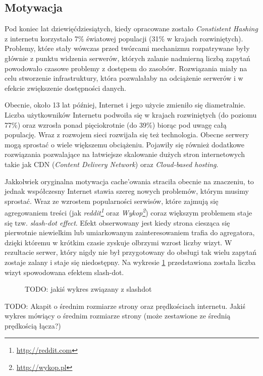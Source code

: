 \documentclass[a4paper,11pt]{scrartcl}
\newcommand{\s}{ }
\newcommand{\keszowania}{cache'owania}
\begin{document}
\subsection{Motywacja}
Pod koniec lat dziewięćdziesiątych, kiedy opracowane zostało \textit{Constistent Hashing} z internetu korzystało 7\% światowej populacji (31\% w krajach rozwiniętych). Problemy, które stały wówczas przed twórcami mechanizmu rozpatrywane były głównie z punktu widzenia serwerów, których zalanie nadmierną liczbą zapytań powodowało czasowe problemy z dostępem do zasobów. Rozwiązania miały na celu stworzenie infrastruktury, która pozwalałaby na odciążenie serwerów i w efekcie zwiększenie dostępności danych.

Obecnie, około 13 lat później, Internet i jego użycie zmieniło się diametralnie. Liczba użytkowników Internetu podwoiła się w krajach rozwiniętych (do poziomu 77\%) oraz wzrosła ponad pięciokrotnie (do 39\%) biorąc pod uwagę całą populację. Wraz z rozwojem sieci rozwijała się też technologia. Obecne serwery mogą sprostać o wiele większemu obciążeniu. Pojawiły się również dodatkowe rozwiązania pozwalające na łatwiejsze skalowanie dużych stron internetowych takie jak CDN (\textit{Content Delivery Network}) oraz \textit{Cloud-based hosting}.

Jakkolwiek oryginalna motywacja \keszowania\s straciła obecnie na znaczeniu, to jednak współczesny Internet stawia szereg nowych problemów, którym musimy sprostać. Wraz ze wzrostem popularności serwisów, które zajmują się agregowaniem treści (jak \textit{reddit\footnote{\url{http://reddit.com}}} oraz \textit{Wykop\footnote{\url{http://wykop.pl}}}) coraz większym problemem staje się tzw. \textit{slash-dot effect}. Efekt obserwowany jest kiedy strona ciesząca się pierwotnie niewielkim lub umiarkowanym zainteresowaniem trafia do agregatora, dzięki któremu w krótkim czasie zyskuje olbrzymi wzrost liczby wizyt. W rezultacie serwer, który nigdy nie był przygotowany do obsługi tak wielu zapytań zostaje zalany i staje się niedostępny. Na wykresie \ref{fig_slashdot} przedstawiona została liczba wizyt spowodowana efektem slash-dot.

\begin{figure}
\caption{TODO: jakiś wykres związany z slashdot}
\label{fig_slashdot}
\end{figure}


TODO: Akapit o średnim rozmiarze strony oraz prędkościach internetu. Jakiś wykres mówiący o średnim rozmiarze strony (może zestawione ze średnią prędkością łącza?)
\end{document}
